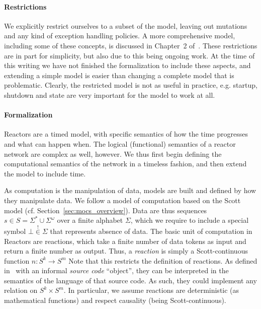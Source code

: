 \paragraph{Restrictions}
We explicitly restrict ourselves to a subset of the model, leaving out mutations and any kind of exception handling policies.
A more comprehensive model, including some of these concepts, is discussed in Chapter~2 of~\cite{lohstroh_phdthesis}.
These restrictions are in part for simplicity, but also due to this being ongoing work.
At the time of this writing we have not finished the formalization to include these aspects, and extending a simple model is easier than changing a complete model that is problematic.
Clearly, the restricted model is not as useful in practice, e.g. startup, shutdown and state are very important for the model to work at all.

\paragraph{Formalization}
Reactors are a timed model, with specific semantics of how the time progresses and what can happen when.
The logical (functional) semantics of a reactor network are complex as well, however.
We thus first begin defining the computational semantics of the network in a timeless fashion, and then extend the model to include time.

As computation is the manipulation of data, models are built and defined by how they manipulate data.
We follow a model of computation based on the Scott model (cf. Section~\ref{sec:mocs_overview}).
Data are thus sequences $s \in S = \Sigma^* \cup \Sigma^\omega$ over a finite alphabet $\Sigma$, which we require to include a special symbol $\bot \overset{!}{\in} \Sigma$ that represents absence of data.
The basic unit of computation in Reactors are reactions, which take a finite number of data tokens as input and return a finite number as output.
Thus, a \emph{reaction} is simply a Scott-continuous function $n : S^k \rightarrow S^m$
Note that this restricts the definition of reactions.
As defined in~\cite{lohstroh_cyphy19} with an informal \emph{source code} ``object'', they can be interpreted in the semantics of the language of that source code.
As such, they could implement any relation on $S^k \times S^m$.
In particular, we assume reactions are deterministic (as mathematical functions) and respect causality (being Scott-continuous).


